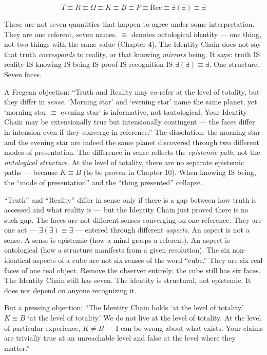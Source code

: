 \documentclass[10pt, openany, oneside]{book}
\begin{document}
\vspace{0.8em}

$$T \equiv R \equiv \Omega \equiv K \equiv B \equiv P \equiv \text{Rec} \equiv \exists(\exists) \equiv \exists$$

These are not seven quantities that happen to agree under some interpretation. They are one referent, seven names. $\equiv$ denotes ontological identity --- one thing, not two things with the same value (Chapter 4). The Identity Chain does not say that truth \textit{corresponds} to reality, or that knowing \textit{mirrors} being. It says: truth IS reality IS knowing IS being IS proof IS recognition IS $\exists(\exists) \equiv \exists$. One structure. Seven faces.

A Fregean objection: ``Truth and Reality may co-refer at the level of totality, but they differ in \textit{sense}. `Morning star' and `evening star' name the same planet, yet `morning star $\equiv$ evening star' is informative, not tautological. Your Identity Chain may be extensionally true but intensionally contingent --- the faces differ in intension even if they converge in reference.'' The dissolution: the morning star and the evening star are indeed the same planet discovered through two different modes of presentation. The difference in sense reflects the \textit{epistemic path}, not the \textit{ontological structure}. At the level of totality, there are no separate epistemic paths --- because $K \equiv B$ (to be proven in Chapter 10). When knowing IS being, the ``mode of presentation'' and the ``thing presented'' collapse.

``Truth'' and ``Reality'' differ in sense only if there is a gap between how truth is accessed and what reality is --- but the Identity Chain just proved there is no such gap. The faces are not different senses converging on one reference. They are one act --- $\exists(\exists) \equiv \exists$ --- entered through different \textit{aspects}. An aspect is not a sense. A sense is epistemic (how a mind grasps a referent). An aspect is ontological (how a structure manifests from a given resolution). The six non-identical aspects of a cube are not six senses of the word ``cube.'' They are six real faces of one real object. Remove the observer entirely: the cube still has six faces. The Identity Chain still has seven. The identity is structural, not epistemic. It does not depend on anyone recognizing it.

But a pressing objection: ``The Identity Chain holds `at the level of totality.' $K \equiv B$ `at the level of totality.' We do not live at the level of totality. At the level of particular experience, $K \neq B$ --- I can be wrong about what exists. Your claims are trivially true at an unreachable level and false at the level where they matter.''
\end{document}

